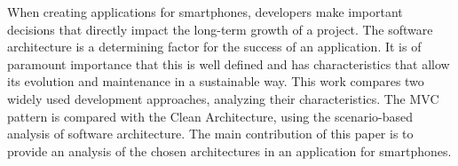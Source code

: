 When creating applications for smartphones, developers make important decisions that directly impact the long-term growth of a project.
The software architecture is a determining factor for the success of an application.
It is of paramount importance that this is well defined and has characteristics that allow its evolution and maintenance in a sustainable way.
This work compares two widely used development approaches, analyzing their characteristics.
The MVC pattern is compared with the Clean Architecture, using the scenario-based analysis of software architecture.
The main contribution of this paper is to provide an analysis of the chosen architectures in an application for smartphones.